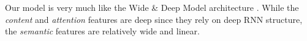 Our model is very much like the Wide \& Deep Model architecture \cite{cheng2016wide}.
While the \textit{content} and \textit{attention}  features are deep since they rely on deep RNN structure, the \textit{semantic} features are relatively wide and linear.



%
%
%
%
%	
%		
%		
%		

